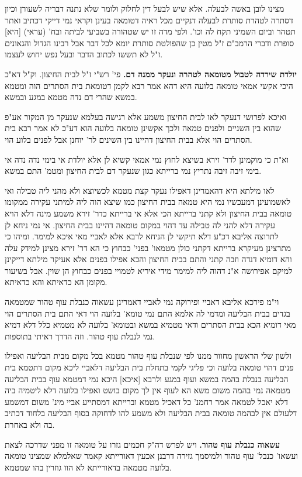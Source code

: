 \documentclass[12pt, openany]{book}
\begin{document}
{מצינו לובן באשה לבעלה. אלא שיש לבעל דין לחלוק ולומר שלא נתנה דבריה לשעורן וכיון דסתרה לטהרת סותרת לבעלה דנקיים מכל ראיה דטומאה בעינן וקראי נמי דייקי דכתיב ואתר תטהר וביום השמיני תקח לה וכו'. ולפי מדה זו יש שטהורה בשביעי לביתה ובח' (עראי) [היא] סופרת ודברי הרמב"ם ז"ל מטין כן שהפולטת סותרת יומא לכל דבר אבל רבינו הגדול והגאונים ז"ל לא תששו לכתוב הדבר ובעל נפש יחוש לעצמו. 
\par\textbf{יולדת שירדה לטבול מטומאה לטהרה ונעקר ממנה דם.}  פי' רש"י ז"ל לבית החיצון. וק"ל דא"כ היכי אקשי אמאי טומאה בלועה היא דהא אמר רבא לקמן דטומאת בית הסתרים הוה ומטמא במשא שהרי דם נדה מטמא במגע ובמשא.\par ואיכא לפרושי דנעקר לאו לבית החיצון משמע אלא רגישה בעלמא שנעקר מן המקור אע"פ שהוא בין השניים ולפנים טמאה ולכך אקשינן טומאה בלועה הוא דע"כ לא אמר רבא בית הסתרים הוי אלא בבית החיצון דהיינו בין השינים לר' יוחנן אבל לפנים בלוע הוי.\par וא"ת כי מוקמינן לדר' זירא בשיצא לחוץ נמי אמאי קשיא לן אלא יולדת אי בימי נדה נדה אי בימי זיבה זיבה נתריץ נמי ברייתא כגון שנעקר דם לבית החיצון ומטמ' התם במשא.\par  לאו מילתא היא דהאמרינן דאפילו נעקר קצת מטמא לכשיוצא ולא מהני ליה טבילה ואי לאשמועינן דמעכשיו נמי היא טמאה בבית החיצון כמו שיצא הוה ליה למיתני עקירה ממקומו טומאה בבית החיצון ולא קתני ברייתא הכי אלא אי ברייתא כדר' זירא משמע מינה דלא הויא עקירה דלא להני לה טבילה עד דהוי במקום טומאה דהיינו בבית החיצון. אי נמי ניחא לן לתרוצה אליבא דכ"ע דלא תיקשי לן הניחא לרבא אלא לאביי מאי איכא למימר. ומיהו כי מתרצינן מעיקרא ברייתא דקתני כולן מטמאו' בפני' כבחוץ כי הא דר' זירא מצינן למידק עלה והא דומיא דנדה וזבה קתני והתם בבית החיצון והכא אפילו בפנים אלא אעיקר מילתא דייקינן למיקם אפירושה א"נ דהוה ליה למימר מידי איריא לטמויי בפנים כבחוץ הן שוין. אבל בשיעור מקומן הא כדאיתא והא כדאיתא.\par  וי"מ פירכא אליבא דאביי ופירוקה נמי לאביי דאמרינן עשאוה כנבלת עוף טהור שמטמאה בגדים בבית הבליעה ומדמי לה אלמא התם נמי טומא' בלועה הוי דאי התם בית הסתרים הוי מאי דומיא הכא בבית הסתרים ודאי מטמיא במשא ובטומא' בלועה לא מטמיא כלל דלא דמיא נמי לנבלת עוף טהור. וזה הדרך ראיתי בתוספות.\par ולשון שלי הראשון מחוור ממנו לפי שנבלת עוף טהור מטמא בכל מקום מבית הבליעה ואפילו פנים דהוי טומאה בלועה וכי פליגי לקמי בתחלת בית הבליעה דלאביי ליכא מקום דתטמא בית הבליעה בנבלת בהמה במשא ועוף במגע ולרבא [איכא] היכא נמי דמטמא עוף בבית הבליעה מטמאה נמי בהמה משום משא הא לעוף אין לך מקום בושט ואפילו בלועה דלא ליטמיה ביה דלא יאכל לטמאה אמר רחמנ' כל דאכיל מטמא וברייתא דמסתייע אביי מינ' משום דמשמע דלעולם אין לבהמה טומאה בבית הבליעה ולא משמע להו לדחוקה בסוף הבליעה בלחוד דכתיב בה ולא באחרת. 
\par\textbf{עשאוה כנבלת עוף טהור.}  ויש לפרש דה"ק חכמים גזרו על טומאה זו מפני שדרכה לצאת ועשאו' כנבל' עוף טהור ולמיסמך גזירה דרבנן אכעין דאורייתא קאמר שאלמלא שמצינו טומאה בלועה מטמאה בדאורייתא לא הוו גוזרין בהו שמטמא. 
\par}
\end{document}
